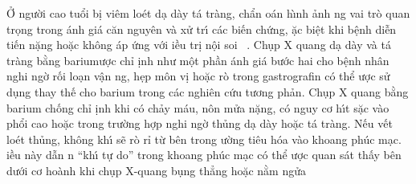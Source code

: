 \documentclass[9pt,twocolumn]{article}
\begin{document}
Ở người cao tuổi b\d{i} vi{\^{e}}m lo{\'e}t d{\d{a}} d\`{a}y t\'{a} tr\`{a}ng, chẩn \text{\dj}o\'{a}n h\`{\i}nh ảnh ng vai tr\`{o} quan tr\d{o}ng trong \text{\dj}\'{a}nh gi\'{a} c{\u{a}}n nguy{\^{e}}n v\`{a} xử tr\'{\i} c\'{a}c bi{{\'{\^{e}}}}n chứng, \text{\dj}ặc bi{\^{\d{e}}}t khi b{\^{\d{e}}}nh di{\~{\^e}}n ti{{\'{\^{e}}}}n nặng hoặc kh{\^o}ng \text{\dj}\'{a}p ứng với \text{\dj}iều tr\d{i} n{\^{\d{o}}}i soi\unskip~\cite{2901310:34531813} . Ch\d{u}p X quang d{\d{a}} d\`{a}y v\`{a} t\'{a} tr\`{a}ng bằng barium\textbf{\space }\text{\dj}ược chỉ \text{\dj}\d{i}nh như m{\^{\d{o}}}t phần \text{\dj}\'{a}nh gi\'{a} bước hai cho b{\^{\d{e}}}nh nh\^{a}n nghi ngờ rối lo{\d{a}}n v{\^{\d{a}}}n ng, h\d{e}p m{\^o}n v\d{i} hoặc r\`{o} trong  gastrografin c{\'{o}} thể \text{\dj}ược sử d\d{u}ng thay th{{\'{\^{e}}}} cho barium trong c\'{a}c nghi{\^{e}}n cứu tương phản. Ch\d{u}p X quang bằng barium chống chỉ \text{\dj}\d{i}nh khi c{\'{o}} chảy m\'{a}u, n{\^o}n mửa nặng, c{\'{o}} nguy cơ h\'{\i}t sặc v\`{a}o phổi cao hoặc trong trường hợp nghi ngờ thủng d{\d{a}} d\`{a}y hoặc t\'{a} tr\`{a}ng. N{{\'{\^{e}}}}u v{{\'{\^{e}}}}t lo{\'e}t thủng, kh{\^o}ng kh\'{\i} sẽ r\`{o} rỉ từ b{\^{e}}n trong \text{\dj}ường ti{\^{e}}u h{\'{o}}a v\`{a}o khoang ph\'{u}c m{\d{a}}c. \text{\DJ}iều n\`{a}y dẫn n ``kh\'{\i} tự do'' trong khoang ph\'{u}c m{\d{a}}c c{\'{o}} thể \text{\dj}ược quan s\'{a}t thấy b{\^{e}}n dưới cơ ho\`{a}nh khi ch\d{u}p X-quang b\d{u}ng thẳng hoặc nằm ngửa\unskip~\cite{2901310:34531806}
\end{document}
